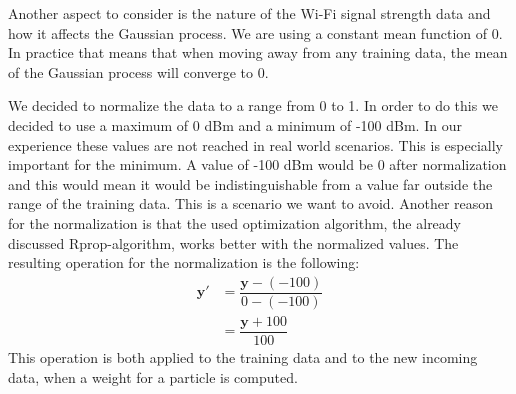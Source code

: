 Another aspect to consider is the nature of the Wi-Fi signal strength data and how it affects the Gaussian process. We are using a constant mean function of 0. In practice that means that when moving away from any training data, the mean of the Gaussian process will converge to 0. 

We decided to normalize the data to a range from 0 to 1. In order to do this we decided to use a maximum of 0 dBm and a minimum of -100 dBm. In our experience these values are not reached in real world scenarios. This is especially important for the minimum. A value of -100 dBm would be 0 after normalization and this would mean it would be indistinguishable from a value far outside the range of the training data. This is a scenario we want to avoid. Another reason for the normalization is that the used optimization algorithm, the already discussed Rprop-algorithm, works better with the normalized values. 
The resulting operation for the normalization is the following:
\begin{equation}
\begin{aligned}
\mathbf{y'} &= \dfrac{\mathbf{y}-(-100)}{0 - (-100)}\\
&= \dfrac{\mathbf{y} + 100}{100}
\end{aligned}
\end{equation}
This operation is both applied to the training data and to the new incoming data, when a weight for a particle is computed. 

